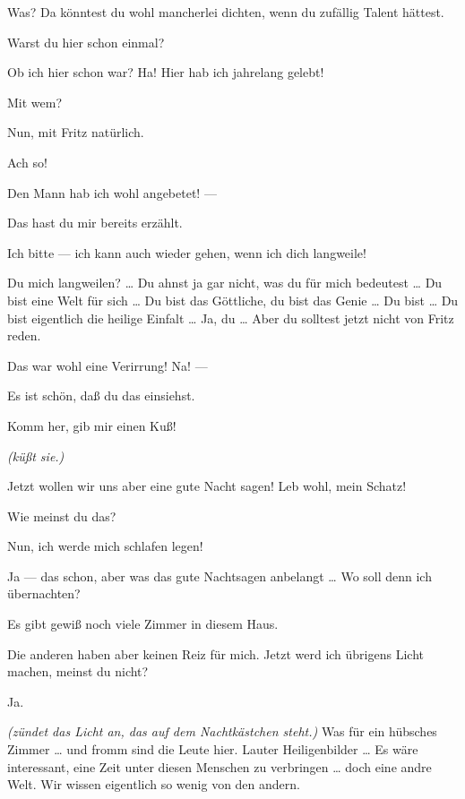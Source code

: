 \documentclass[
	final,
	a4paper,
	ngerman,
	mpinclude = true, %
	twoside = true,
	open = right,
	cleardoublepage = plain,
	DIV = 13,
	BCOR = 1cm,
	titlepage = firstiscover,
	]{scrbook}
\newcommand{\direction}[1]{\textit{(#1)}}
\newcommand{\thecharacter}[1]{\textup{\textsc{#1}}}
\newcommand{\thedichter}{\thecharacter{Dichter}}
\newcommand{\theschauspielerin}{\thecharacter{Schauspielerin}}
\newcommand{\character}[1]{\item[#1:]}
\newcommand{\dichter}{\character{\thedichter}}
\newcommand{\schauspielerin}{\character{\theschauspielerin}}
\begin{document}
\begin{play}
	\schauspielerin
	Was? Da könntest du wohl mancherlei dichten, wenn du zufällig Talent hättest.

	\dichter
	Warst du hier schon einmal?

	\schauspielerin
	Ob ich hier schon war? Ha! Hier hab ich jahrelang gelebt!

	\dichter
	Mit wem?

	\schauspielerin
	Nun, mit Fritz natürlich.

	\dichter
	Ach so!

	\schauspielerin
	Den Mann hab ich wohl angebetet! ---

	\dichter
	Das hast du mir bereits erzählt.

	\schauspielerin
	Ich bitte --- ich kann auch wieder gehen, wenn ich dich langweile!

	\dichter
	Du mich langweilen? \ldots{} Du ahnst ja gar nicht, was du für mich bedeutest \ldots{} Du bist eine Welt für sich \ldots{} Du bist das Göttliche, du bist das Genie \ldots{} Du bist \ldots{} Du bist eigentlich die heilige Einfalt \ldots{} Ja, du \ldots{} Aber du solltest jetzt nicht von Fritz reden.

	\schauspielerin
	Das war wohl eine Verirrung! Na! ---

	\dichter
	Es ist schön, daß du das einsiehst.

	\schauspielerin
	Komm her, gib mir einen Kuß!

	\dichter
	\direction{küßt sie.}

	\schauspielerin
	Jetzt wollen wir uns aber eine gute Nacht sagen! Leb wohl, mein Schatz!

	\dichter
	Wie meinst du das?

	\schauspielerin
	Nun, ich werde mich schlafen legen!

	\dichter
	Ja --- das schon, aber was das gute Nachtsagen anbelangt \ldots{} Wo soll denn ich übernachten?

	\schauspielerin
	Es gibt gewiß noch viele Zimmer in diesem Haus.

	\dichter
	Die anderen haben aber keinen Reiz für mich. Jetzt werd ich übrigens Licht machen, meinst du nicht?

	\schauspielerin
	Ja.

	\dichter
	\direction{zündet das Licht an, das auf dem Nachtkästchen steht.} Was für ein hübsches Zimmer \ldots{} und fromm sind die Leute hier. Lauter Heiligenbilder \ldots{} Es wäre interessant, eine Zeit unter diesen Menschen zu verbringen \ldots{} doch eine andre Welt. Wir wissen eigentlich so wenig von den andern.


\end{play}
\end{document}
